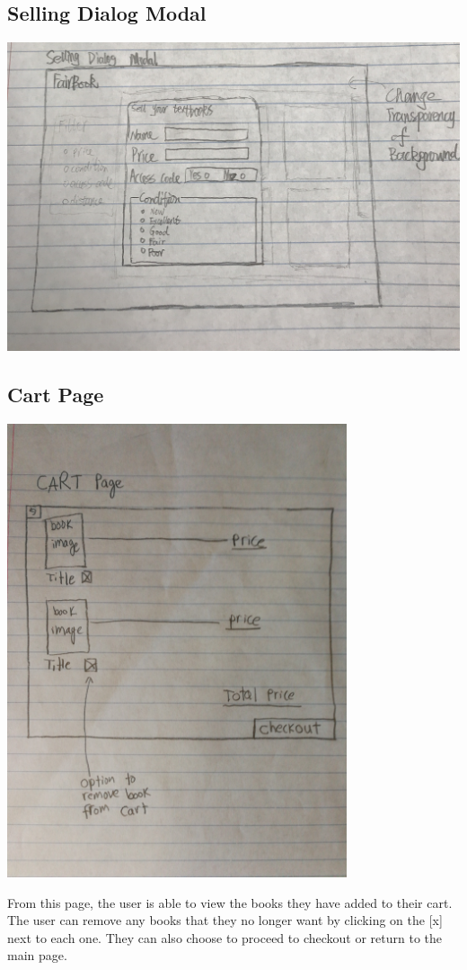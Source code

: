 \documentclass[12pt]{article}
\begin{document}
		\subsection{Selling Dialog Modal}
		\includegraphics[width=14cm]{selling_dialog_modal.eps}


		\subsection{Cart Page}
		\includegraphics[width=10cm]{cart_page.eps}
		\par
		From this page, the user is able to view the books they have added to their cart. 
		The user can remove any books that they no longer want by clicking on the [x] next to each one. 
		They can also choose to proceed to checkout or return to the main page.
\end{document}
